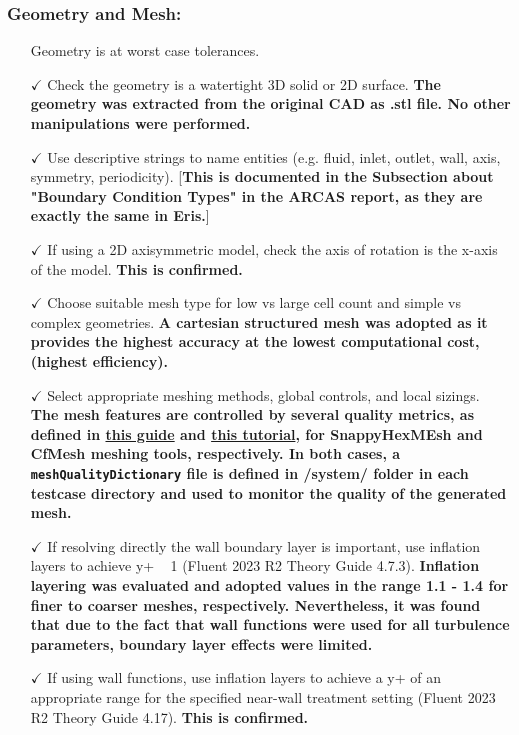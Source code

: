 \documentclass[12pt]{article}
\begin{document}
\subsubsection*{Geometry and Mesh:}
\begin{itemize}
    \item[] Geometry is at worst case tolerances.
    \item[$\checkmark$] Check the geometry is a watertight 3D solid or 2D surface.
    \textbf{The geometry was extracted from the original CAD as .stl file. No other manipulations were performed.}
    \item[$\checkmark$] Use descriptive strings to name entities (e.g. fluid, inlet, outlet, wall, axis, symmetry, periodicity). [\textbf{This is documented in the Subsection about "Boundary Condition Types" in the ARCAS report, as they are exactly the same in Eris.}]
    \item[$\checkmark$] If using a 2D axisymmetric model, check the axis of rotation is the x-axis of the model. \textbf{This is confirmed.}
    \item[$\checkmark$] Choose suitable mesh type for low vs large cell count and simple vs complex geometries. \textbf{A cartesian structured mesh was adopted as it provides the highest accuracy at the lowest computational cost, (highest efficiency).}
    \item[$\checkmark$] Select appropriate meshing methods, global controls, and local sizings.
    \textbf{The mesh features are controlled by several quality metrics, as defined in \href{https://www.openfoam.com/documentation/guides/latest/doc/guide-meshing-snappyhexmesh-meshquality.html}{this guide} and \href{https://www.wolfdynamics.com/tutorials.html?id=177}{this tutorial}, for SnappyHexMEsh and CfMesh meshing tools, respectively. In both cases, a \texttt{meshQualityDictionary} file is defined in /system/ folder in each testcase directory and used to monitor the quality of the generated mesh.}
    \item[$\checkmark$] If resolving directly the wall boundary layer is important, use inflation layers to achieve y+ ~ 1 (Fluent 2023 R2 Theory Guide 4.7.3).
    \textbf{Inflation layering was evaluated and adopted values in the range 1.1 - 1.4 for finer to coarser meshes, respectively. Nevertheless, it was found that due to the fact that wall functions were used for all turbulence parameters, boundary layer effects were limited.}
    \item[$\checkmark$] If using wall functions, use inflation layers to achieve a y+ of an appropriate range for the specified near-wall treatment setting (Fluent 2023 R2 Theory Guide 4.17). \textbf{This is confirmed.}

\end{itemize}
\end{document}
